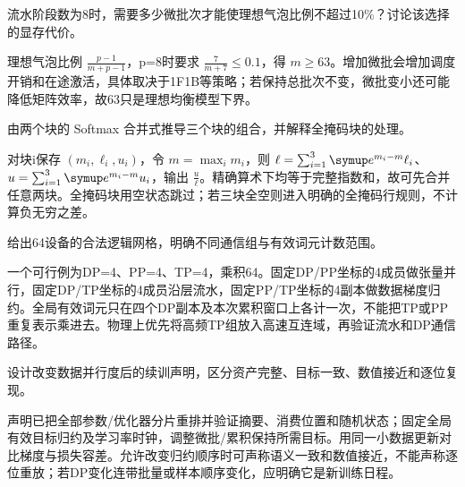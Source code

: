\begin{exercises}
\begin{exercise} 流水阶段数为8时，需要多少微批次才能使理想气泡比例不超过10\%？讨论该选择的显存代价。

\begin{solution}
理想气泡比例 $\frac{p-1}{m+p-1}$，p=8时要求 $\frac{7}{m+7}\le0.1$，得 $m\ge63$。增加微批会增加调度开销和在途激活，具体取决于1F1B等策略；若保持总批次不变，微批变小还可能降低矩阵效率，故63只是理想均衡模型下界。
\end{solution}
\end{exercise}

\begin{exercise}\optional 由两个块的 Softmax 合并式推导三个块的组合，并解释全掩码块的处理。

\begin{solution}
对块i保存 $(m_i,\ell_i,u_i)$，令 $m=\max_i m_i$，则 $\ell=\sum_{i=1}^3\conste{}^{m_i-m}\ell_i$、$u=\sum_{i=1}^3\conste{}^{m_i-m}u_i$，输出 $\frac{u}{\ell}$。精确算术下均等于完整指数和，故可先合并任意两块。全掩码块用空状态跳过；若三块全空则进入明确的全掩码行规则，不计算负无穷之差。
\end{solution}
\end{exercise}

\begin{exercise}\optional 给出64设备的合法逻辑网格，明确不同通信组与有效词元计数范围。

\begin{solution}
一个可行例为DP=4、PP=4、TP=4，乘积64。固定DP/PP坐标的4成员做张量并行，固定DP/TP坐标的4成员沿层流水，固定PP/TP坐标的4副本做数据梯度归约。全局有效词元只在四个DP副本及本次累积窗口上各计一次，不能把TP或PP重复表示乘进去。物理上优先将高频TP组放入高速互连域，再验证流水和DP通信路径。
\end{solution}
\end{exercise}

\begin{exercise} 设计改变数据并行度后的续训声明，区分资产完整、目标一致、数值接近和逐位复现。

\begin{solution}
声明已把全部参数/优化器分片重排并验证摘要、消费位置和随机状态；固定全局有效目标归约及学习率时钟，调整微批/累积保持所需目标。用同一小数据更新对比梯度与损失容差。允许改变归约顺序时可声称语义一致和数值接近，不能声称逐位重放；若DP变化连带批量或样本顺序变化，应明确它是新训练日程。
\end{solution}
\end{exercise}

\end{exercises}
